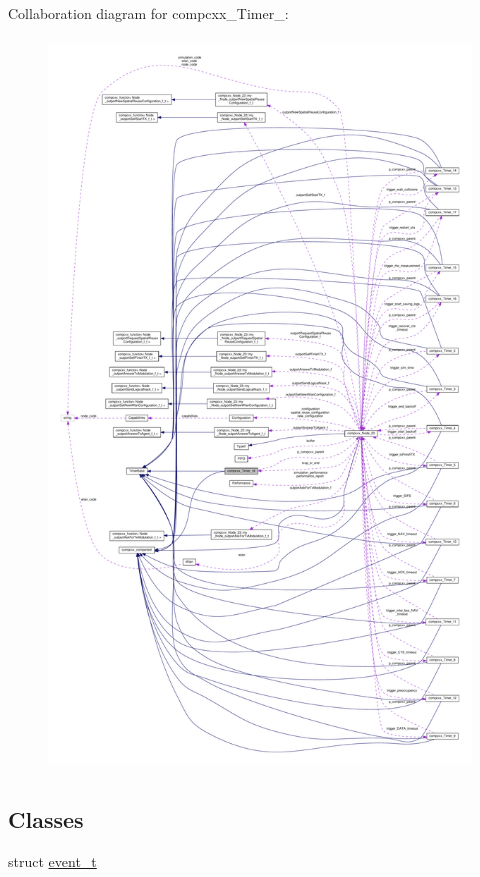 Collaboration diagram for compcxx\+\_\+\+Timer\+\_\+:\nopagebreak
\begin{figure}[H]
\begin{center}
\leavevmode
\includegraphics[height=550pt]{classcompcxx__Timer__18__coll__graph}
\end{center}
\end{figure}
\subsection*{Classes}
\begin{DoxyCompactItemize}
\item 
struct \hyperlink{structcompcxx__Timer__18_1_1event__t}{event\+\_\+t}
\end{DoxyCompactItemize}

